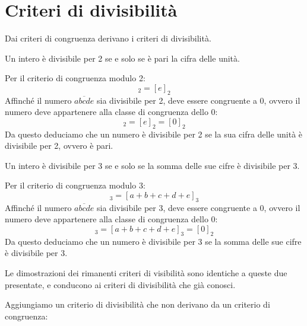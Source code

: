 \section{Criteri di divisibilità}
\label{sec:criteri_divisibilita}

Dai criteri di congruenza derivano i criteri di divisibilità.

\begin{teorema}
    Un intero è divisibile per 2 se e solo se è pari la cifra delle unità.

    Per il criterio di congruenza modulo 2:
    \begin{equation*}
        [\overline{abcde}]_2 = [e]_2
    \end{equation*}
    Affinché il numero $\overline{abcde}$ sia divisibile per 2, deve essere congruente a 0, ovvero il numero deve appartenere alla classe di congruenza dello 0:
    \begin{equation*}
        [\overline{abcde}]_2 = [e]_2 = [0]_2
    \end{equation*}
    Da questo deduciamo che un numero è divisibile per 2 se la sua cifra delle unità è divisibile per 2, ovvero è pari.
\end{teorema}

\begin{teorema}
    Un intero è divisibile per 3 se e solo se la somma delle sue cifre è divisibile per 3.

    Per il criterio di congruenza modulo 3:
    \begin{equation*}
        [\overline{abcde}]_3 = [a + b + c + d + e]_3
    \end{equation*}
    Affinché il numero $\overline{abcde}$ sia divisibile per 3, deve essere congruente a 0, ovvero il numero deve appartenere alla classe di congruenza dello 0:
    \begin{equation*}
        [\overline{abcde}]_3 = [a + b + c + d + e]_3 = [0]_2
    \end{equation*}
    Da questo deduciamo che un numero è divisibile per 3 se la somma delle sue cifre è divisibile per 3.
\end{teorema}

Le dimostrazioni dei rimanenti criteri di visibilità sono identiche a queste due presentate, e conducono ai criteri di divisibilità che già conosci.

Aggiungiamo un criterio di divisibilità che non derivano da un criterio di congruenza:

